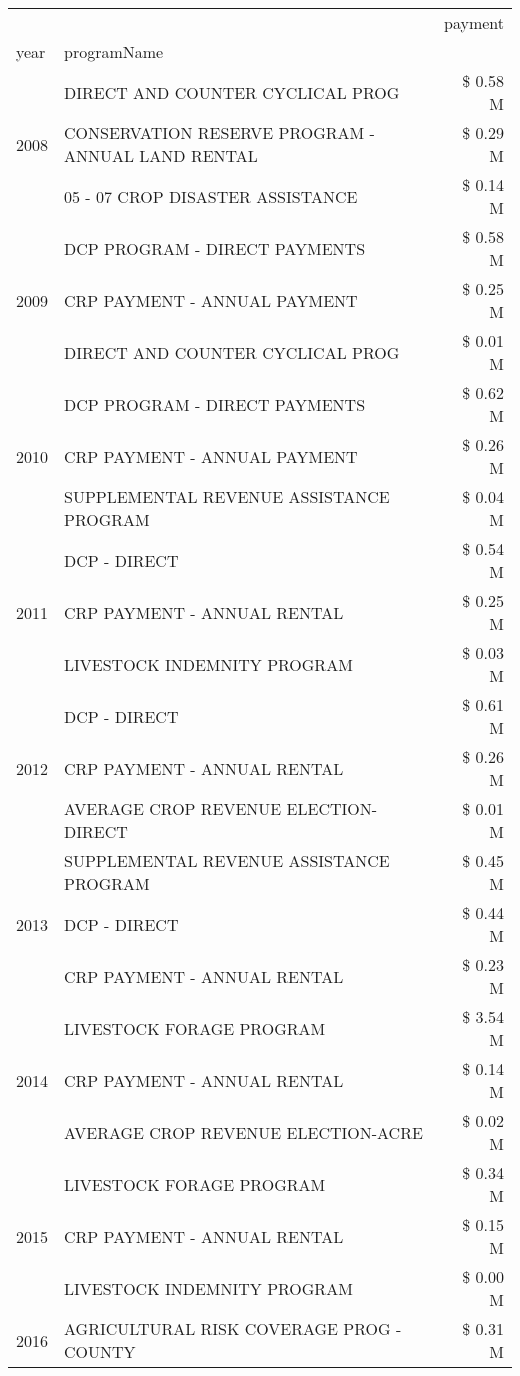 \begin{tabular}{llr}
\toprule
 &  & payment \\
year & programName &  \\
\midrule
\multirow[t]{3}{*}{2008} & DIRECT AND COUNTER CYCLICAL PROG & \$ 0.58 M \\
 & CONSERVATION RESERVE PROGRAM - ANNUAL LAND RENTAL & \$ 0.29 M \\
 & 05 - 07 CROP DISASTER ASSISTANCE & \$ 0.14 M \\
\cline{1-3}
\multirow[t]{3}{*}{2009} & DCP PROGRAM - DIRECT PAYMENTS & \$ 0.58 M \\
 & CRP PAYMENT - ANNUAL PAYMENT & \$ 0.25 M \\
 & DIRECT AND COUNTER CYCLICAL PROG & \$ 0.01 M \\
\cline{1-3}
\multirow[t]{3}{*}{2010} & DCP PROGRAM - DIRECT PAYMENTS & \$ 0.62 M \\
 & CRP PAYMENT - ANNUAL PAYMENT & \$ 0.26 M \\
 & SUPPLEMENTAL REVENUE ASSISTANCE PROGRAM & \$ 0.04 M \\
\cline{1-3}
\multirow[t]{3}{*}{2011} & DCP - DIRECT & \$ 0.54 M \\
 & CRP PAYMENT - ANNUAL RENTAL & \$ 0.25 M \\
 & LIVESTOCK INDEMNITY PROGRAM & \$ 0.03 M \\
\cline{1-3}
\multirow[t]{3}{*}{2012} & DCP - DIRECT & \$ 0.61 M \\
 & CRP PAYMENT - ANNUAL RENTAL & \$ 0.26 M \\
 & AVERAGE CROP REVENUE ELECTION-DIRECT & \$ 0.01 M \\
\cline{1-3}
\multirow[t]{3}{*}{2013} & SUPPLEMENTAL REVENUE ASSISTANCE PROGRAM & \$ 0.45 M \\
 & DCP - DIRECT & \$ 0.44 M \\
 & CRP PAYMENT - ANNUAL RENTAL & \$ 0.23 M \\
\cline{1-3}
\multirow[t]{3}{*}{2014} & LIVESTOCK FORAGE PROGRAM & \$ 3.54 M \\
 & CRP PAYMENT - ANNUAL RENTAL & \$ 0.14 M \\
 & AVERAGE CROP REVENUE ELECTION-ACRE & \$ 0.02 M \\
\cline{1-3}
\multirow[t]{3}{*}{2015} & LIVESTOCK FORAGE PROGRAM & \$ 0.34 M \\
 & CRP PAYMENT - ANNUAL RENTAL & \$ 0.15 M \\
 & LIVESTOCK INDEMNITY PROGRAM & \$ 0.00 M \\
\cline{1-3}
\multirow[t]{3}{*}{2016} & AGRICULTURAL RISK COVERAGE PROG - COUNTY & \$ 0.31 M \\

\end{tabular}
